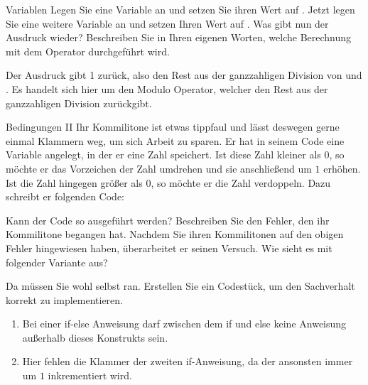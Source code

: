 \documentclass{../preamble}
\begin{document}
\clearpage

\begin{task}[credit = \stars{1}{3}]{Variablen}
    Legen Sie eine Variable  an und setzen Sie ihren Wert auf . Jetzt legen Sie eine weitere Variable  an und setzen Ihren Wert auf . Was gibt nun der Ausdruck  wieder? Beschreiben Sie in Ihren eigenen Worten, welche Berechnung mit dem \code{\%} Operator durchgeführt wird.

    \begin{solution}
        Der Ausdruck gibt 1 zurück, also den Rest aus der ganzzahligen Division von  und . Es handelt sich hier um den Modulo Operator, welcher den Rest aus der ganzzahligen Division zurückgibt.
    \end{solution}
\end{task}

\begin{task}[credit = \stars{1}{3}]{Bedingungen II}
    Ihr Kommilitone ist etwas tippfaul und lässt deswegen gerne einmal Klammern weg, um sich  Arbeit zu sparen. Er hat in seinem Code eine Variable  angelegt, in der er eine Zahl speichert. Ist diese Zahl kleiner als \(0\), so möchte er das Vorzeichen der Zahl umdrehen und sie anschließend um \(1\) erhöhen. Ist die Zahl hingegen größer als \(0\), so möchte er die Zahl verdoppeln. Dazu schreibt er folgenden Code:
    
    Kann der Code so ausgeführt werden? Beschreiben Sie den Fehler, den ihr Kommilitone begangen hat.
    \br
    Nachdem Sie ihren Kommilitonen auf den obigen Fehler hingewiesen haben, überarbeitet er seinen Versuch. Wie sieht es mit folgender Variante aus?
    
    Da müssen Sie wohl selbst ran. Erstellen Sie ein Codestück, um den Sachverhalt korrekt zu implementieren.

    \begin{solution}
        \begin{enumerate}
            \item Bei einer \textcolor{keywordcolor}{if}-\textcolor{keywordcolor}{else} Anweisung darf zwischen dem \textcolor{keywordcolor}{if} und \textcolor{keywordcolor}{else} keine Anweisung außerhalb dieses Konstrukts sein.
            \item Hier fehlen die Klammer der zweiten \textcolor{keywordcolor}{if}-Anweisung, da der  ansonsten immer um \(1\) inkrementiert wird.
        \end{enumerate}
        
    \end{solution}
\end{task}
\end{document}
